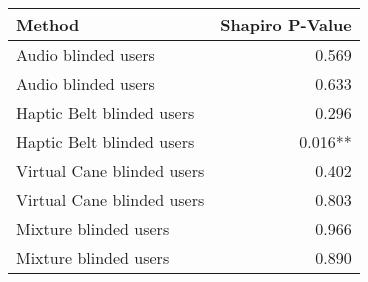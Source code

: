 
\centering
\begin{tabular}{lr}
\toprule
                    Method & Shapiro P-Value \\
\midrule
       Audio blinded users &           0.569 \\
       Audio blinded users &           0.633 \\
 Haptic Belt blinded users &           0.296 \\
 Haptic Belt blinded users &         0.016** \\
Virtual Cane blinded users &           0.402 \\
Virtual Cane blinded users &           0.803 \\
     Mixture blinded users &           0.966 \\
     Mixture blinded users &           0.890 \\
\bottomrule
\end{tabular}

